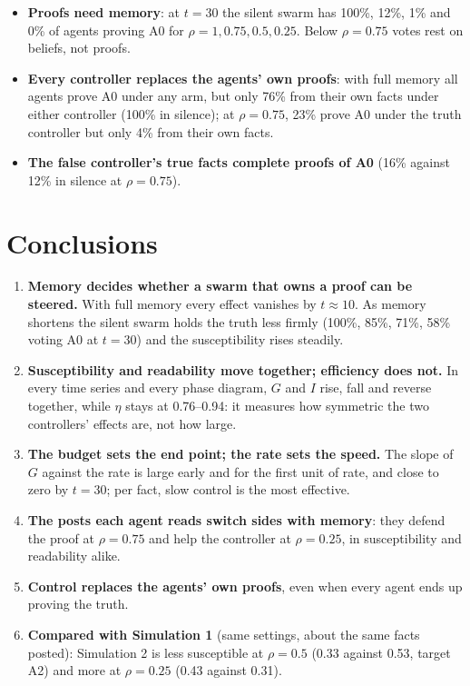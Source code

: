 \documentclass[10pt,a4paper]{article}
\begin{document}
\begin{itemize}\itemsep1pt
\item \textbf{Proofs need memory}: at $t = 30$ the silent swarm has 100\%, 12\%, 1\% and 0\% of agents proving A0
  for $\rho = 1, 0.75, 0.5, 0.25$. Below $\rho = 0.75$ votes rest on beliefs, not proofs.
\item \textbf{Every controller replaces the agents' own proofs}: with full memory all agents prove A0 under any
  arm, but only 76\% from their own facts under either controller (100\% in silence); at $\rho = 0.75$, 23\% prove A0
  under the truth controller but only 4\% from their own facts.
\item \textbf{The false controller's true facts complete proofs of A0} (16\% against 12\% in silence at
  $\rho = 0.75$).
\end{itemize}

\section{Conclusions}

\begin{enumerate}\itemsep2pt
\item \textbf{Memory decides whether a swarm that owns a proof can be steered.} With full memory every effect
  vanishes by $t \approx 10$. As memory shortens the silent swarm holds the truth less firmly (100\%, 85\%, 71\%,
  58\% voting A0 at $t = 30$) and the susceptibility rises steadily.
\item \textbf{Susceptibility and readability move together; efficiency does not.} In every time series and every
  phase diagram, $G$ and $I$ rise, fall and reverse together, while $\eta$ stays at 0.76--0.94: it measures how
  symmetric the two controllers' effects are, not how large.
\item \textbf{The budget sets the end point; the rate sets the speed.} The slope of $G$ against the rate is large
  early and for the first unit of rate, and close to zero by $t = 30$; per fact, slow control is the most effective.
\item \textbf{The posts each agent reads switch sides with memory}: they defend the proof at $\rho = 0.75$ and help
  the controller at $\rho = 0.25$, in susceptibility and readability alike.
\item \textbf{Control replaces the agents' own proofs}, even when every agent ends up proving the truth.
\item \textbf{Compared with Simulation 1} (same settings, about the same facts posted): Simulation 2 is less
  susceptible at $\rho = 0.5$ (0.33 against 0.53, target A2) and more at $\rho = 0.25$ (0.43 against 0.31).
\end{enumerate}
\end{document}
